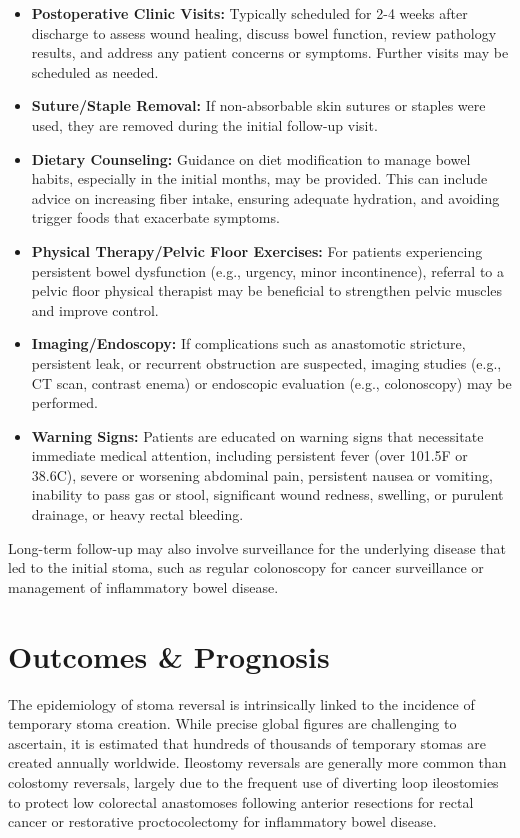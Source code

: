 \begin{itemize}
  \item \textbf{Postoperative Clinic Visits:} Typically scheduled for 2-4 weeks after discharge to assess wound healing, discuss bowel function, review pathology results, and address any patient concerns or symptoms. Further visits may be scheduled as needed.
  
  \item \textbf{Suture/Staple Removal:} If non-absorbable skin sutures or staples were used, they are removed during the initial follow-up visit.
  
  \item \textbf{Dietary Counseling:} Guidance on diet modification to manage bowel habits, especially in the initial months, may be provided. This can include advice on increasing fiber intake, ensuring adequate hydration, and avoiding trigger foods that exacerbate symptoms.
  
  \item \textbf{Physical Therapy/Pelvic Floor Exercises:} For patients experiencing persistent bowel dysfunction (e.g., urgency, minor incontinence), referral to a pelvic floor physical therapist may be beneficial to strengthen pelvic muscles and improve control.
  
  \item \textbf{Imaging/Endoscopy:} If complications such as anastomotic stricture, persistent leak, or recurrent obstruction are suspected, imaging studies (e.g., CT scan, contrast enema) or endoscopic evaluation (e.g., colonoscopy) may be performed.
  
  \item \textbf{Warning Signs:} Patients are educated on warning signs that necessitate immediate medical attention, including persistent fever (over 101.5\textdegree F or 38.6\textdegree C), severe or worsening abdominal pain, persistent nausea or vomiting, inability to pass gas or stool, significant wound redness, swelling, or purulent drainage, or heavy rectal bleeding.
\end{itemize}

Long-term follow-up may also involve surveillance for the underlying disease that led to the initial stoma, such as regular colonoscopy for cancer surveillance or management of inflammatory bowel disease.

\section*{Outcomes \& Prognosis}
The epidemiology of stoma reversal is intrinsically linked to the incidence of temporary stoma creation. While precise global figures are challenging to ascertain, it is estimated that hundreds of thousands of temporary stomas are created annually worldwide. Ileostomy reversals are generally more common than colostomy reversals, largely due to the frequent use of diverting loop ileostomies to protect low colorectal anastomoses following anterior resections for rectal cancer or restorative proctocolectomy for inflammatory bowel disease. 

